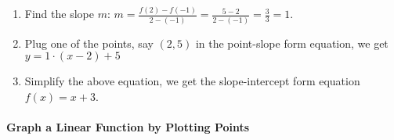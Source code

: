 	\begin{solution}	
	\begin{enumerate}[label={\textbf{\textup{Step \arabic*.}}~}, itemsep=0em]
			\item Find the slope $m$: $m=\frac{f(2)-f(-1)}{2-(-1)}=\frac{5-2}{2-(-1)}=\frac{3}{3}=1$.
			\item Plug one of the points, say $(2, 5)$ in the point-slope form equation, we get $y=1\cdot(x-2)+5$
			\item Simplify the above equation, we get the slope-intercept form equation $f(x)=x+3$.
		\end{enumerate}
	\end{solution}



\paragraph*{Graph a Linear Function by Plotting Points}

\mbox{}


